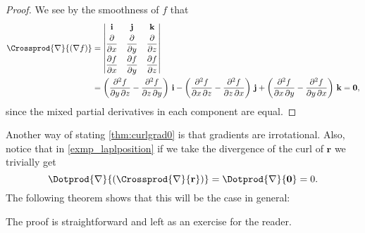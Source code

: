 
\begin{proof}
 We see by the smoothness of $f$ that
 \begin{align*}
  \Crossprod{\nabla}{(\nabla f)} &= \begin{vmatrix}
   \textbf{i} & \textbf{j} & \textbf{k} \vspace{1mm}\\ \dfrac{\partial}{\partial x} & \dfrac{\partial}{\partial y} &
    \dfrac{\partial}{\partial z} \vspace{1mm}\\
   \dfrac{\partial f}{\partial x} & \dfrac{\partial f}{\partial y} & \dfrac{\partial f}{\partial z}
   \end{vmatrix}\\
  &= \left( \frac{\partial^2 f}{\partial y\,\partial z}-\frac{\partial^2 f}{\partial z\,\partial y} \right) \,\textbf{i}
   - \left( \frac{\partial^2 f}{\partial x\,\partial z}-\frac{\partial^2 f}{\partial z\,\partial x} \right) \,\textbf{j}
   + \left( \frac{\partial^2 f}{\partial x\,\partial y}-\frac{\partial^2 f}{\partial y\,\partial x} \right) \,\textbf{k}
  = \textbf{0} ,
 \end{align*}
 since the mixed partial derivatives in each component are equal.
\end{proof}


Another way of stating \autoref{thm:curlgrad0} is that gradients are irrotational. Also, notice that in \autoref{exmp_laplposition} if we take the divergence of the curl of $\textbf{r}$ we trivially get
\[
 \Dotprod{\nabla}{(\Crossprod{\nabla}{\textbf{r}})} = \Dotprod{\nabla}{\textbf{0}} = 0 .
\]
The following theorem shows that this will be the case in general:


The proof is straightforward and left as an exercise for the reader.


